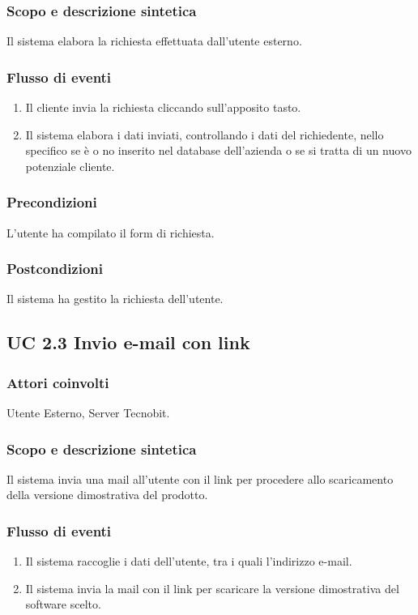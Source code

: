 \subsubsection*{Scopo e descrizione sintetica}
Il sistema elabora la richiesta effettuata dall'utente esterno.
\subsubsection*{Flusso di eventi}
\begin{enumerate}
\item Il cliente invia la richiesta cliccando sull'apposito tasto.
\item Il sistema elabora i dati inviati, controllando i dati del richiedente, nello specifico se \`e o no inserito nel database
dell'azienda o se si tratta di un nuovo potenziale cliente.
\end{enumerate}
\subsubsection*{Precondizioni} L'utente ha compilato il form di richiesta.
\subsubsection*{Postcondizioni} Il sistema ha gestito la richiesta dell'utente.

\subsection*{UC 2.3 Invio e-mail con link}
\subsubsection*{Attori coinvolti} Utente Esterno, Server Tecnobit.
\subsubsection*{Scopo e descrizione sintetica}
Il sistema invia una mail all'utente con il link per procedere allo scaricamento della versione dimostrativa del prodotto.
\subsubsection*{Flusso di eventi}
\begin{enumerate}
\item Il sistema raccoglie i dati dell'utente, tra i quali l'indirizzo e-mail.
\item Il sistema invia la mail con il link per scaricare la versione dimostrativa del software scelto.
\end{enumerate}
